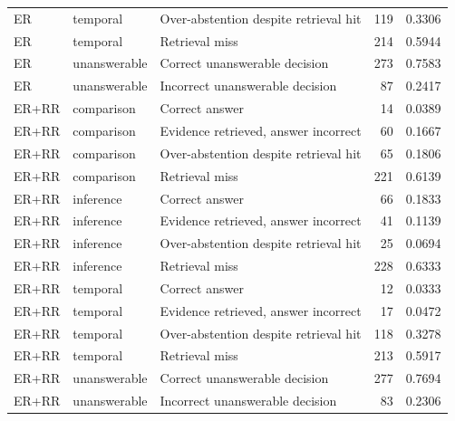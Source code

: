 \begin{tabular}{lllrr}
ER & temporal & Over-abstention despite retrieval hit & 119 & 0.3306 \\
ER & temporal & Retrieval miss & 214 & 0.5944 \\
ER & unanswerable & Correct unanswerable decision & 273 & 0.7583 \\
ER & unanswerable & Incorrect unanswerable decision & 87 & 0.2417 \\
ER+RR & comparison & Correct answer & 14 & 0.0389 \\
ER+RR & comparison & Evidence retrieved, answer incorrect & 60 & 0.1667 \\
ER+RR & comparison & Over-abstention despite retrieval hit & 65 & 0.1806 \\
ER+RR & comparison & Retrieval miss & 221 & 0.6139 \\
ER+RR & inference & Correct answer & 66 & 0.1833 \\
ER+RR & inference & Evidence retrieved, answer incorrect & 41 & 0.1139 \\
ER+RR & inference & Over-abstention despite retrieval hit & 25 & 0.0694 \\
ER+RR & inference & Retrieval miss & 228 & 0.6333 \\
ER+RR & temporal & Correct answer & 12 & 0.0333 \\
ER+RR & temporal & Evidence retrieved, answer incorrect & 17 & 0.0472 \\
ER+RR & temporal & Over-abstention despite retrieval hit & 118 & 0.3278 \\
ER+RR & temporal & Retrieval miss & 213 & 0.5917 \\
ER+RR & unanswerable & Correct unanswerable decision & 277 & 0.7694 \\
ER+RR & unanswerable & Incorrect unanswerable decision & 83 & 0.2306 \\
\bottomrule
\end{tabular}
